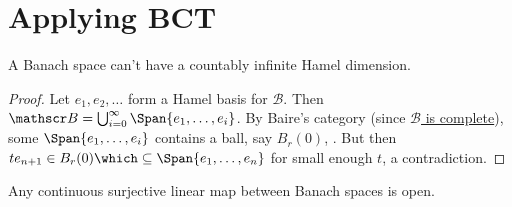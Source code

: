 	

\section{Applying BCT}
	
	\begin{prp}
		A Banach space can't have a countably infinite Hamel dimension.
	\end{prp}
	
	\begin{proof}
		Let $e_1, e_2, \ldots$ form a Hamel basis for $\mathscr B$. Then $\mathscr B = \bigcup_{i = 0}^\infty\Span\{e_1, \ldots, e_i\}$. By Baire's category (since \uline{$\mathscr B$ is complete}), some $\Span\{e_1, \ldots, e_i\}$ contains a ball, say $B_r(0)$, \wlogg. But then $te_{n + 1}\in B_r(0)\which\subseteq \Span\{e_1, \ldots, e_n\}$ for small enough $t$, a contradiction.
	\end{proof}
	
	\begin{thm}
		Any continuous surjective linear map between Banach spaces is open.
	\end{thm}
	
